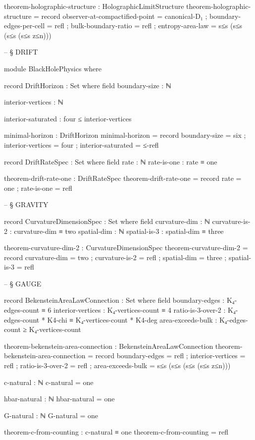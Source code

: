 \documentclass[11pt,a4paper]{book}
\begin{document}
\begin{code}
theorem-holographic-structure : HolographicLimitStructure
theorem-holographic-structure = record
  { observer-at-compactified-point = canonical-D₁
  ; boundary-edges-per-cell = refl
  ; bulk-boundary-ratio = refl
  ; entropy-area-law = s≤s (s≤s (s≤s (s≤s z≤n)))
  }


-- § DRIFT

module BlackHolePhysics where

  record DriftHorizon : Set where
    field
      boundary-size : ℕ
      
      interior-vertices : ℕ
      
      interior-saturated : four ≤ interior-vertices
      
  minimal-horizon : DriftHorizon
  minimal-horizon = record
    { boundary-size = six
    ; interior-vertices = four
    ; interior-saturated = ≤-refl
    }

record DriftRateSpec : Set where
  field
    rate : ℕ
    rate-is-one : rate ≡ one

theorem-drift-rate-one : DriftRateSpec
theorem-drift-rate-one = record
  { rate = one
  ; rate-is-one = refl
  }


-- § GRAVITY

record CurvatureDimensionSpec : Set where
  field
    curvature-dim : ℕ
    curvature-is-2 : curvature-dim ≡ two
    spatial-dim : ℕ
    spatial-is-3 : spatial-dim ≡ three

theorem-curvature-dim-2 : CurvatureDimensionSpec
theorem-curvature-dim-2 = record
  { curvature-dim = two
  ; curvature-is-2 = refl
  ; spatial-dim = three
  ; spatial-is-3 = refl
  }


-- § GAUGE

record BekensteinAreaLawConnection : Set where
  field
    boundary-edges     : K₄-edges-count ≡ 6
    interior-vertices  : K₄-vertices-count ≡ 4
    ratio-is-3-over-2  : K₄-edges-count * K4-chi ≡ K₄-vertices-count * K4-deg
    area-exceeds-bulk  : K₄-edges-count ≥ K₄-vertices-count

theorem-bekenstein-area-connection : BekensteinAreaLawConnection
theorem-bekenstein-area-connection = record
  { boundary-edges = refl
  ; interior-vertices = refl
  ; ratio-is-3-over-2 = refl
  ; area-exceeds-bulk = s≤s (s≤s (s≤s (s≤s z≤n)))
  }

c-natural : ℕ
c-natural = one

hbar-natural : ℕ
hbar-natural = one

G-natural : ℕ
G-natural = one

theorem-c-from-counting : c-natural ≡ one
theorem-c-from-counting = refl



\end{code}
\end{document}
